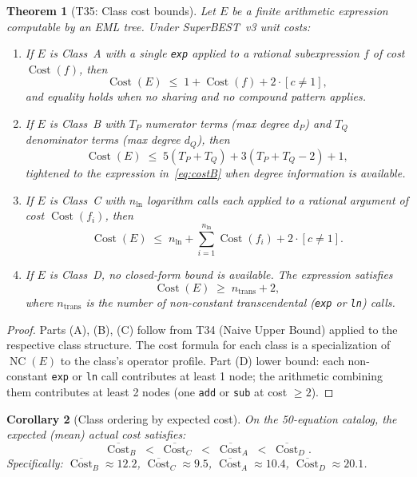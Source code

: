 \documentclass[12pt,a4paper]{article}
\newtheorem{theorem}{Theorem}[section]
\newtheorem{corollary}[theorem]{Corollary}
\theoremstyle{definition}
\newcommand{\NC}{\operatorname{NC}}
\newcommand{\Cost}{\operatorname{Cost}}
\begin{document}
\begin{theorem}[T35: Class cost bounds]
\label{thm:T35}
Let $E$ be a finite arithmetic expression computable by an EML tree.
Under SuperBEST~v3 unit costs:
\begin{enumerate}
  \item[\textup{(A)}]
    If $E$ is Class~A with a single \texttt{exp} applied to a rational
    subexpression $f$ of cost $\Cost(f)$, then
    \[
      \Cost(E) \;\leq\; 1 + \Cost(f) + 2 \cdot [c \neq 1],
    \]
    and equality holds when no sharing and no compound pattern applies.
  \item[\textup{(B)}]
    If $E$ is Class~B with $T_P$ numerator terms (max degree $d_P$)
    and $T_Q$ denominator terms (max degree $d_Q$), then
    \[
      \Cost(E) \;\leq\; 5(T_P + T_Q) + 3(T_P + T_Q - 2) + 1,
    \]
    tightened to the expression in~\eqref{eq:costB} when degree
    information is available.
  \item[\textup{(C)}]
    If $E$ is Class~C with $n_{\ln}$ logarithm calls each applied to
    a rational argument of cost $\Cost(f_i)$, then
    \[
      \Cost(E) \;\leq\; n_{\ln} + \sum_{i=1}^{n_{\ln}} \Cost(f_i)
                       + 2 \cdot [c \neq 1].
    \]
  \item[\textup{(D)}]
    If $E$ is Class~D, no closed-form bound is available.
    The expression satisfies
    \[
      \Cost(E) \;\geq\; n_{\mathrm{trans}} + 2,
    \]
    where $n_{\mathrm{trans}}$ is the number of non-constant transcendental
    (\texttt{exp} or \texttt{ln}) calls.
\end{enumerate}
\end{theorem}

\begin{proof}
Parts (A), (B), (C) follow from T34 (Naive Upper Bound) applied to the
respective class structure.
The cost formula for each class is a specialization of $\NC(E)$ to the
class's operator profile.
Part (D) lower bound: each non-constant \texttt{exp} or \texttt{ln} call
contributes at least 1 node; the arithmetic combining them contributes
at least 2 nodes (one \texttt{add} or \texttt{sub} at cost $\geq 2$).
\end{proof}

\begin{corollary}[Class ordering by expected cost]
\label{cor:ordering}
On the 50-equation catalog, the expected (mean) actual cost satisfies:
\[
  \overline{\Cost}_B \;<\; \overline{\Cost}_C \;<\; \overline{\Cost}_A
  \;<\; \overline{\Cost}_D.
\]
Specifically: $\overline{\Cost}_B \approx 12.2$,
$\overline{\Cost}_C \approx 9.5$,
$\overline{\Cost}_A \approx 10.4$,
$\overline{\Cost}_D \approx 20.1$.
\end{corollary}
\end{document}
